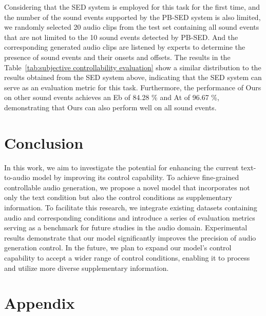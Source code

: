 \documentclass[letterpaper]{article} %
\begin{document}
 Considering that the SED system is employed for this task for the first time, and the number of the sound events supported by the PB-SED system is also limited, we randomly selected 20 audio clips from the test set containing all sound events that are not limited to the 10 sound events detected by PB-SED. And the corresponding generated audio clips are listened by experts to determine the presence of sound events and their onsets and offsets. The results in the Table~\ref{tab:subjective controllability evaluation} show a similar distribution to the results obtained from the SED system above, indicating that the SED system can serve as an evaluation metric for this task. Furthermore, the performance of Ours on other sound events achieves an Eb of 84.28 \% and At of 96.67 \%, demonstrating that Ours can also perform well on all sound events.

\section{Conclusion}

In this work, we aim to investigate the potential for enhancing the current text-to-audio model by improving its control capability. To achieve fine-grained controllable audio generation, we propose a novel model that incorporates not only the text condition but also the control conditions as supplementary information. To facilitate this research, we integrate existing datasets containing audio and corresponding conditions and introduce a series of evaluation metrics serving as a benchmark for future studies in the audio domain. Experimental results demonstrate that our model significantly improves the precision of audio generation control. In the future, we plan to expand our model's control capability to accept a wider range of control conditions, enabling it to process and utilize more diverse supplementary information.


\section{Appendix}
\end{document}
